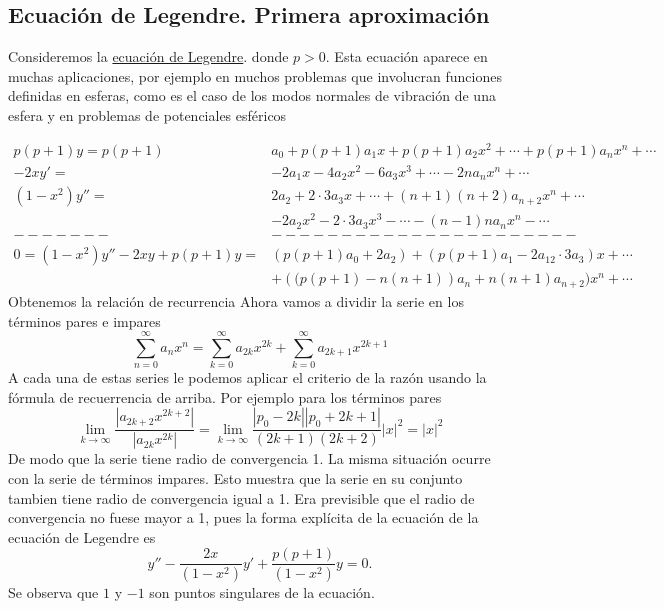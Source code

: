 \subsection{Ecuación de Legendre. Primera aproximación}

\begin{ejemplo}{} Consideremos la \href{http://es.wikipedia.org/wiki/Polinomios_de_Legendre}{ecuación de Legendre}.
donde $p>0$. Esta ecuación aparece en muchas aplicaciones, por ejemplo en muchos problemas que involucran funciones definidas en esferas, como es el caso de los modos normales de vibración de una esfera y en problemas de potenciales esféricos

\[\begin{split}
   p(p+1)y= p(p+1)&a_0+ p(p+1)a_1x+ p(p+1)a_2x^2+\cdots+ p(p+1)a_nx^n+\cdots\\
  -2xy'=&-2a_1x-4a_2x^2-6a_3x^3+\cdots-2na_{n}x^n+\cdots\\
(1-x^2)y''=& 2a_2+2\cdot 3a_3x+\cdots +(n+1)(n+2)a_{n+2}x^n+\cdots\\
          &-2a_2x^2-2\cdot 3a_3x^3-\cdots -(n-1)na_{n}x^n-\cdots\\
     -------&----------------------\\
0=(1-x^2)y''-2xy+p(p+1)y =& (p(p+1)a_0+2a_2)+(p(p+1)a_1-2a_12\cdot 3a_3)x+\cdots\\
     &+ \left( (p(p+1)-n(n+1)\right)a_n+n(n+1)a_{n+2})x^n+\cdots
  \end{split}
\]
Obtenemos la relación de recurrencia
 Ahora vamos a dividir la serie en los términos pares e impares
\[\sum\limits_{n=0}^{\infty}a_nx^n= \sum\limits_{k=0}^{\infty}a_{2k}x^{2k}+\sum\limits_{k=0}^{\infty}a_{2k+1}x^{2k+1}\]
A cada una de estas series le podemos aplicar el criterio de la razón usando la fórmula de recuerrencia de arriba. Por ejemplo para los términos pares
\[\lim\limits_{k\to\infty}\frac{|a_{2k+2}x^{2k+2}|}{|a_{2k}x^{2k}|}=\lim\limits_{k\to\infty}\frac{|p_0-2k||p_0+2k+1|}{(2k+1)(2k+2)}|x|^2=|x|^2\]
De modo que la serie tiene radio de convergencia 1. La misma situación ocurre con la serie de términos impares. Esto muestra que la serie en su conjunto tambien tiene radio de convergencia igual a 1. Era previsible que el radio de convergencia no fuese mayor a 1, pues la forma explícita de la ecuación de la ecuación de Legendre es
\[y''-\frac{2x}{(1-x^2)}y'+\frac{p(p+1)}{(1-x^2)}y=0.\]
Se observa que $1$ y $-1$ son puntos singulares de la ecuación.


\end{ejemplo}
